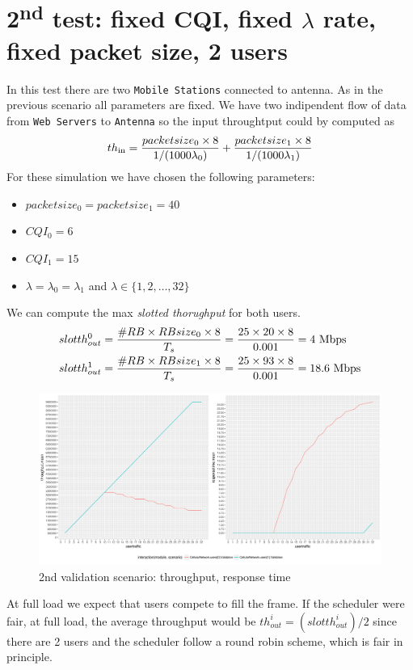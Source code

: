 \section{2\textsuperscript{nd} test: fixed CQI, fixed \(\lambda\) rate, fixed packet size, 2 users}
In this test there are two \texttt{Mobile Stations} connected to antenna. As in the previous scenario all parameters are fixed. We have two indipendent flow of data from \texttt{Web Servers} to \texttt{Antenna} so the input throughtput could by computed as
\[ th\textsubscript{in} = \frac{packetsize\textsubscript{0} \times 8}{1/(1000\lambda\textsubscript{0})} + \frac{packetsize\textsubscript{1} \times 8}{1/(1000\lambda\textsubscript{1})}\]
For these simulation we have chosen the following parameters:
\begin{itemize}
	\item \(packetsize_{0} = packetsize_{1} = 40\)
	\item \(CQI_{0} = 6\)
	\item \(CQI_{1} = 15\)
	\item \(\lambda = \lambda_{0} = \lambda_{1}\) and \(\lambda \in \{1,2,\ldots,32\}\)
\end{itemize}
We can compute the max \textit{slotted thorughput} for both users.
\begin{align}
	slotth^{0}_{out} &= \frac{\#RB \times RBsize_{0} \times 8 }{T_s} = \frac{25 \times 20 \times 8}{0.001} = 4 \textnormal{ Mbps}\nonumber \\ 
	slotth^{1}_{out} &= \frac{\#RB \times RBsize_{1} \times 8 }{T_s} = \frac{25 \times 93 \times 8}{0.001} = 18.6 \textnormal{ Mbps} \nonumber
\end{align} 
\begin{figure}[H]
  \includegraphics[width=1\textwidth]{images/plotvalidation2}
  \caption{2nd validation scenario: throughput, response time}
  \label{fig:2nd validation scenario: throughput, response time}
\end{figure}
At full load we expect that users compete to fill the frame. If the scheduler were fair, at full load, the average throughput would be \(th^{i}_{out} = (slotth^{i}_{out})/2\) since there are 2 users and the scheduler follow a round robin scheme, which is fair in principle. 

